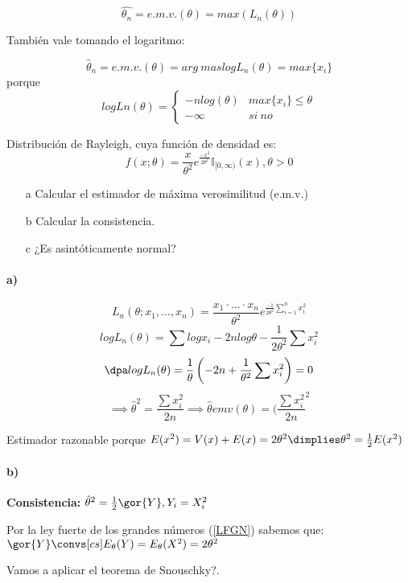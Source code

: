 \begin{problem}[11]
\[\hat{\theta_n} = e.m.v.(\theta) = max\left(L_n(\theta)\right)\]

También vale tomando el logaritmo:

\[\hat{\theta}_n = e.m.v. (\theta) = arg\ mas logL_n(\theta) = max\{x_i\}\]
porque \[ logLn(\theta) = \displaystyle\left\{\begin{array}{cc}
-nlog(\theta) & max\{x_i\} \leq \theta\\
-\infty & si \ no
\end{array}\right.\]
\end{problem}

\begin{problem}[5]
Distribución de Rayleigh, cuya función de densidad es:
\[f(x;\theta) = \frac{x}{\theta^2} e^{\frac{-x^2}{2\theta^2}} \mathbb{I}_{[0,\infty)} (x), \theta > 0\]

\begin{itemize}
\item[a]Calcular el estimador de máxima verosimilitud (e.m.v.)
\item[b]Calcular la consistencia.
\item[c] ¿Es asintóticamente normal?
\end{itemize}

\solution

\paragraph{a)}

\[L_n(\theta;x_1,...,x_n) = \frac{x_1 \cdot ... \cdot x_n}{\theta^2} e^{\frac{-1}{2\theta^2} \sum_{i=1}^n x_i^2}\]
\[log L_n(\theta) = \sum log x_i - 2nlog\theta -\frac{1}{2\theta^2}\sum x_i^2\]
\[\dpa log L_n(\theta) = \frac{1}{\theta} \left(-2n+\frac{1}{\theta^2}\sum x_i^2\right) = 0\]
\[\implies \hat{\theta}^2 = \frac{\sum x_i^2}{2n} \implies \hat{\theta} emv(\theta) = (\frac{\sum x_i^2}{2n}^2\]

Estimador razonable porque $E(x^2) = V(x) + E(x) = 2\theta^2 \dimplies \theta^2 = \frac{1}{2} E(x^2)$

\paragraph{b)}
\textbf{Consistencia:} $\hat{\theta}^2 = \frac{1}{2} \gor{Y}, Y_i = X_i^2$

Por la ley fuerte de los grandes números (\ref{LFGN}) sabemos que: $\gor{Y} \convs[cs] E_{\theta}(Y) = E_{\theta}(X^2) = 2\theta^2$

Vamos a aplicar el teorema de Snouschky?.


\end{problem}

